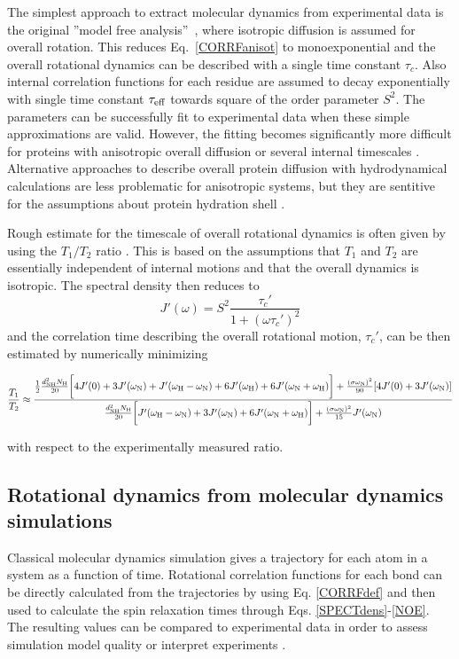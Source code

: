 \documentclass[pre,aps,floatfix,authordate1-4,twocolumn]{revtex4-1}
\begin{document}
The simplest approach to extract molecular dynamics from experimental
data is the original ''model free analysis''~\cite{Lipari82},
where isotropic diffusion is assumed for overall rotation.
This reduces Eq.~\ref{CORRFanisot} to monoexponential and the overall rotational
dynamics can be described with a single time constant $\tau_c$.
Also internal correlation functions for each residue are assumed
to decay exponentially with single time constant $\tau_{\rm eff}$
towards square of the order parameter $S^2$. The parameters can be
successfully fit to experimental data when these simple approximations
are valid. However, the fitting becomes significantly more difficult for proteins 
with anisotropic overall diffusion or several internal timescales \cite{dosset00,luginbuhl97,jarymowycz06}.
Alternative approaches to describe overall protein diffusion with hydrodynamical
calculations are less problematic for anisotropic systems, but they
are sentitive for the assumptions about protein hydration shell \cite{torre00}.

Rough estimate for the timescale of overall rotational dynamics 
is often given by using the $T_1/T_2$ ratio \cite{kay89}. 
This is based on the assumptions that $T_1$ and $T_2$
are essentially independent of internal motions and that the overall
dynamics is isotropic. The spectral density then reduces to 
\begin{equation}
J'(\omega) = S^2\frac{\tau_c'}{1+(\omega \tau_c')^2} 
\end{equation}
and the correlation time describing the overall rotational motion, $\tau_c'$, can 
be then estimated by numerically minimizing
\begin{widetext}
\begin{equation}\label{ratioEQ}
  \frac{T_1}{T_2} \approx  \frac{\frac{1}{2}\frac{d_{\rm{NH}}^2N_{\rm{H}}}{20}\bigg[4J'(0)+3J'(\omega_{\rm{N}})+J'(\omega_{\rm{H}}-\omega_{\rm{N}})+6J'(\omega_{\rm{H}})  +6J'(\omega_{\rm{N}}+\omega_{\rm{H}})\bigg]+\frac{(\sigma \omega_{\rm{N}})^2}{90}[4J'(0) +3J'(\omega_{\rm{N}})]}{\frac{d_{\rm{NH}}^2N_{\rm{H}}}{20}\bigg[J'(\omega_{\rm{H}}-\omega_{\rm{N}})+3J'(\omega_{\rm{N}})+6J'(\omega_{\rm{N}}+\omega_{\rm{H}})\bigg] +\frac{(\sigma \omega_{\rm{N}})^2}{15}J'(\omega_{\rm{N}})}
\end{equation}
\end{widetext}
with respect to the experimentally measured ratio.

\subsection{Rotational dynamics from molecular dynamics simulations}\label{MDanalysis}
Classical molecular dynamics simulation gives a trajectory for each atom in
a system as a function of time. Rotational correlation functions for each bond
can be directly calculated from the trajectories by using Eq. \ref{CORRFdef}
and then used to calculate the spin relaxation times through Eqs. \ref{SPECTdens}-\ref{NOE}.
The resulting values can be compared to experimental data in order to assess simulation model
quality \cite{best04,showalter07a,showalter07b,maragakis08,trbovic08,fisette12} or
interpret experiments \cite{fisette12}.
\end{document}
